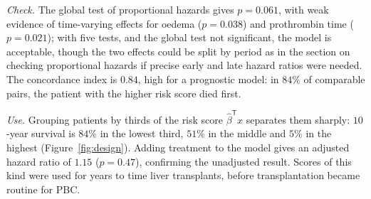 \documentclass[11pt,a4paper]{article}
\numberwithin{equation}{section}
\theoremstyle{definition}
\begin{document}
\emph{Check.} The global test of proportional hazards gives $p = 0.061$, with weak evidence of time-varying effects for oedema ($p = 0.038$) and prothrombin time ($p = 0.021$); with five tests, and the global test not significant, the model is acceptable, though the two effects could be split by period as in the section on checking proportional hazards if precise early and late hazard ratios were needed. The concordance
index is $0.84$, high for a prognostic model: in $84\%$ of comparable pairs, the patient with the higher risk score died first.

\emph{Use.} Grouping patients by thirds of the risk score $\hat\beta^{\mathsf T}x$ separates them sharply: $10$-year survival is $84\%$ in the lowest third, $51\%$ in the middle and $5\%$ in the highest (Figure~\ref{fig:design}). Adding treatment to the model gives an adjusted hazard ratio of $1.15$ ($p = 0.47$), confirming the unadjusted result. Scores of this kind were used for years to time liver transplants, before
transplantation became routine for PBC.
\end{document}
